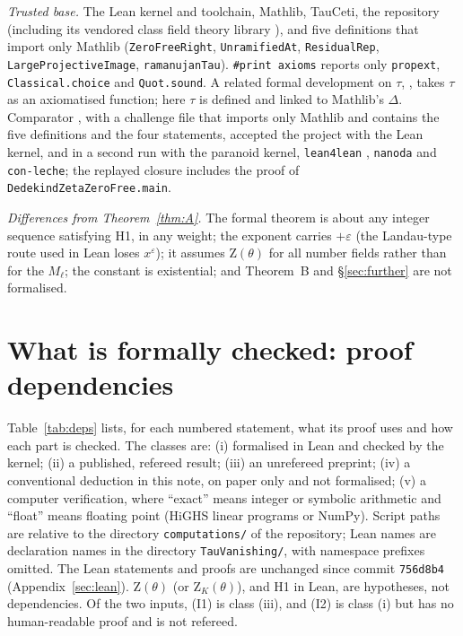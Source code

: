 \documentclass[11pt]{amsart}
\theoremstyle{definition}
\theoremstyle{remark}
\newcommand{\Zt}{\mathrm{Z}}       %
\begin{document}
\emph{Trusted base.} The Lean kernel and toolchain, Mathlib, TauCeti, the repository \cite{CT-Lean} (including its
vendored class field theory library \cite{FAGR}), and five definitions that import only Mathlib
(\texttt{ZeroFreeRight}, \texttt{UnramifiedAt}, \texttt{ResidualRep}, \texttt{LargeProjectiveImage},
\texttt{ramanujanTau}). \texttt{\#print axioms} reports only \texttt{propext}, \texttt{Classical.choice} and
\texttt{Quot.sound}. A related formal development on $\tau$, \cite{AxiomTau}, takes $\tau$ as an axiomatised
function; here $\tau$ is defined and linked to Mathlib's $\Delta$. Comparator \cite{Comparator}, with a challenge file that imports only Mathlib and contains the
five definitions and the four statements, accepted the project with the Lean kernel, and in a second run with the
paranoid kernel, \texttt{lean4lean} \cite{Lean4Lean}, \texttt{nanoda} \cite{nanoda} and \texttt{con-leche}; the
replayed closure includes the proof of \texttt{DedekindZetaZeroFree.main}.

\emph{Differences from Theorem~\ref{thm:A}.} The formal theorem is about any integer sequence satisfying H1, in any
weight; the exponent carries $+\varepsilon$ (the Landau-type route used in Lean loses $x^\varepsilon$); it assumes
$\Zt(\theta)$ for all number fields rather than for the $M_\ell$; the constant is existential; and Theorem~B and
\S\ref{sec:further} are not formalised.

\section{What is formally checked: proof dependencies}\label{sec:deps}

Table~\ref{tab:deps} lists, for each numbered statement, what its proof uses and how each part is checked. The classes
are: (i) formalised in Lean and checked by the kernel; (ii) a published, refereed result; (iii) an unrefereed preprint;
(iv) a conventional deduction in this note, on paper only and not formalised; (v) a computer verification, where
``exact'' means integer or symbolic arithmetic and ``float'' means floating point (HiGHS linear programs or NumPy).
Script paths are relative to the directory \texttt{computations/} of the repository; Lean names are declaration names
in the directory \texttt{TauVanishing/}, with namespace prefixes omitted. The Lean statements and proofs are unchanged
since commit \texttt{756d8b4} (Appendix~\ref{sec:lean}). $\Zt(\theta)$ (or $\Zt_K(\theta)$), and H1 in Lean, are
hypotheses, not dependencies. Of the two inputs, (I1) is class (iii), and (I2) is class (i) but has no human-readable
proof and is not refereed.
\end{document}
